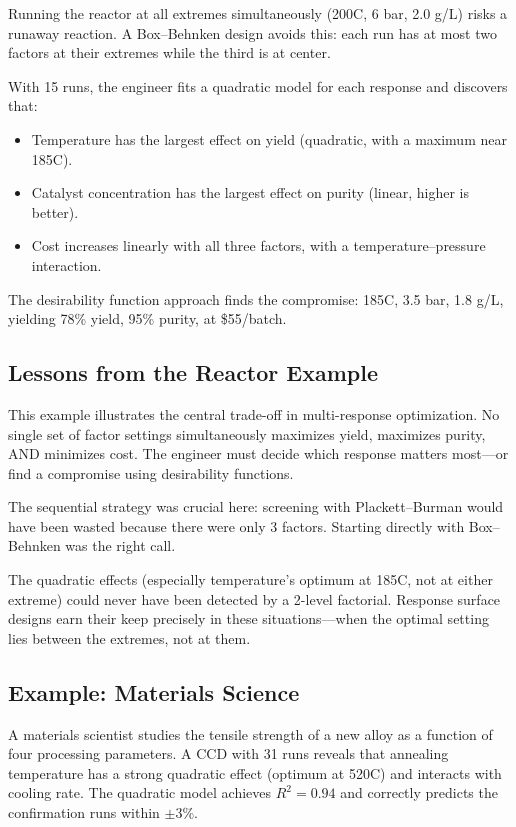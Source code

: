 \documentclass[11pt]{book}
\begin{document}
Running the reactor at all extremes simultaneously (200\textdegree C, 6 bar,
2.0 g/L) risks a runaway reaction. A Box--Behnken design avoids this: each run
has at most two factors at their extremes while the third is at center.

With 15 runs, the engineer fits a quadratic model for each response and discovers
that:
\begin{itemize}[nosep]
\item Temperature has the largest effect on yield (quadratic, with a maximum near
      185\textdegree C).
\item Catalyst concentration has the largest effect on purity (linear, higher is
      better).
\item Cost increases linearly with all three factors, with a temperature--pressure
      interaction.
\end{itemize}

The desirability function approach finds the compromise: 185\textdegree C,
3.5 bar, 1.8 g/L, yielding 78\% yield, 95\% purity, at \$55/batch.

\subsection{Lessons from the Reactor Example}

This example illustrates the central trade-off in multi-response optimization.
No single set of factor settings simultaneously maximizes yield, maximizes
purity, AND minimizes cost. The engineer must decide which response matters
most---or find a compromise using desirability functions.

The sequential strategy was crucial here: screening with Plackett--Burman would
have been wasted because there were only 3 factors. Starting directly with
Box--Behnken was the right call.

The quadratic effects (especially temperature's optimum at 185\textdegree C,
not at either extreme) could never have been detected by a 2-level factorial.
Response surface designs earn their keep precisely in these situations---when
the optimal setting lies between the extremes, not at them.

\subsection{Example: Materials Science}

A materials scientist studies the tensile strength of a new alloy as a function
of four processing parameters. A CCD with 31 runs reveals that annealing
temperature has a strong quadratic effect (optimum at 520\textdegree C) and
interacts with cooling rate. The quadratic model achieves $R^2 = 0.94$ and
correctly predicts the confirmation runs within $\pm 3\%$.
\end{document}
